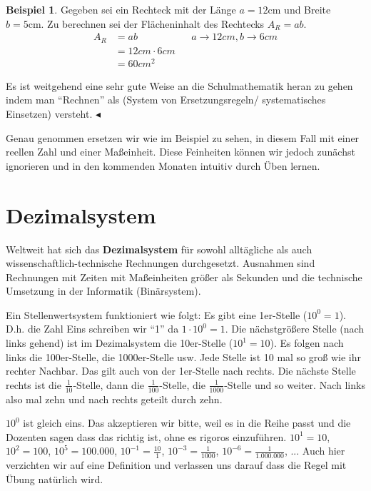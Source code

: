 \documentclass[a4paper]{book}%
\newcommand{\topicend}{
      $\blacktriangleleft$
}
\theoremstyle{definition}
\newtheorem{beispiel}{Beispiel}
\begin{document}
\begin{beispiel}
    Gegeben sei ein Rechteck mit der Länge $a = 12 \text{cm}$ und Breite $b = 5 \text{cm}$. Zu berechnen sei der Flächeninhalt des Rechtecks $A_R = a b$.
    \begin{align}
      A_R & =  a b && a \rightarrow 12 cm, b \rightarrow 6 cm\\
       & =  12 cm \cdot 6 cm &&\\
       & =  60 cm^2 &&
    \end{align}

    Es ist weitgehend eine sehr gute Weise an die Schulmathematik heran zu gehen indem man \enquote{Rechnen} als  (System von Ersetzungsregeln/ systematisches Einsetzen) versteht.\topicend
\end{beispiel}

Genau genommen ersetzen wir wie im Beispiel zu sehen, in diesem Fall mit einer reellen Zahl und einer Maßeinheit. Diese Feinheiten können wir jedoch zunächst ignorieren und in den kommenden Monaten intuitiv durch Üben lernen.


\section{Dezimalsystem}\label{Dezimalsystem}

Weltweit hat sich das \textbf{Dezimalsystem} für sowohl alltägliche als auch wissenschaftlich-technische Rechnungen durchgesetzt. Ausnahmen sind Rechnungen mit Zeiten mit Maßeinheiten größer als Sekunden und die technische Umsetzung in der Informatik (Binärsystem).

Ein Stellenwertsystem funktioniert wie folgt: Es gibt eine 1er-Stelle ($10^0=1$). D.h. die Zahl Eins schreiben wir \enquote{1} da $1 \cdot 10^0 = 1$. Die nächstgrößere Stelle (nach links gehend) ist im Dezimalsystem die 10er-Stelle ($10^1=10$). Es folgen nach links die 100er-Stelle, die 1000er-Stelle usw. Jede Stelle ist 10 mal so groß wie ihr rechter Nachbar. Das gilt auch von der 1er-Stelle nach rechts. Die nächste Stelle rechts ist die $\frac{1}{10}$-Stelle, dann die $\frac{1}{100}$-Stelle, die $\frac{1}{1000}$-Stelle und so weiter. Nach links also mal zehn und nach rechts geteilt durch zehn.

$10^0$ ist gleich eins. Das akzeptieren wir bitte, weil es in die Reihe passt und die Dozenten sagen dass das richtig ist, ohne es rigoros einzuführen. $10^1=10$, $10^2=100$, $10^5=100.000$, $10^{-1}=\frac{10}{1}$, $10^{-3}=\frac{1}{1000}$, $10^{-6}=\frac{1}{1.000.000}$, ... Auch hier verzichten wir auf eine Definition und verlassen uns darauf dass die Regel mit Übung natürlich wird.
\end{document}
